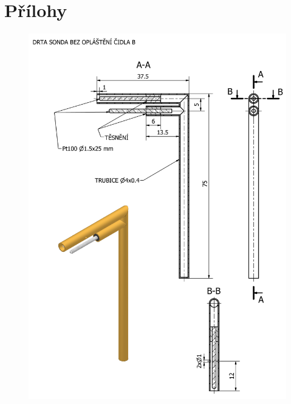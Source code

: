 \section{Přílohy}
 \label{fig:sonda-bez-stineni-B-vykres}
    \begin{figure}[ht!]
        \centering
        \includegraphics[width=\textwidth]{400_SIMULACE_KONSTRUKCNICH_UPRAV/Vykresy_rendery/Sonda_bez_stineni_B_vykres.png}
        
    \end{figure}
    \newpage
{} \label{fig:sonda-se-stinenim-B-vykres}
